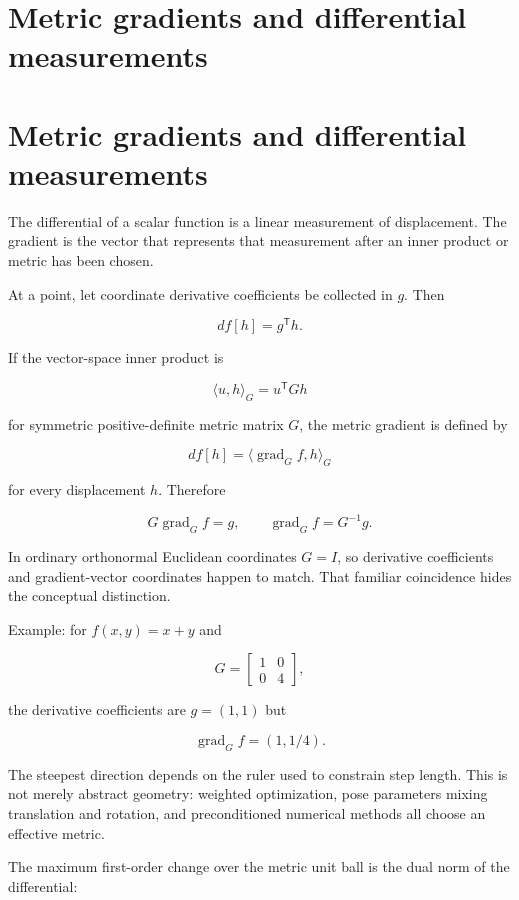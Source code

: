 \hypertarget{appendix-f4acdb1d5563}{}
\section*{Metric gradients and differential measurements}
\section{Metric gradients and differential measurements}\label{metric-gradients-and-differential-measurements}

The differential of a scalar function is a linear measurement of displacement. The gradient is the vector that represents that measurement after an inner product or metric has been chosen.

At a point, let coordinate derivative coefficients be collected in \(g\). Then

\[
df[h]=g^{\mathsf T}h.
\]

If the vector-space inner product is

\[
\langle u,h\rangle_G=u^{\mathsf T}Gh
\]

for symmetric positive-definite metric matrix \(G\), the metric gradient is defined by

\[
df[h]=\langle \operatorname{grad}_G f,h\rangle_G
\]

for every displacement \(h\). Therefore

\[
G\operatorname{grad}_G f=g,
\qquad
\operatorname{grad}_G f=G^{-1}g.
\]

In ordinary orthonormal Euclidean coordinates \(G=I\), so derivative coefficients and gradient-vector coordinates happen to match. That familiar coincidence hides the conceptual distinction.

Example: for \(f(x,y)=x+y\) and

\[
G=\begin{bmatrix}1&0\\0&4\end{bmatrix},
\]

the derivative coefficients are \(g=(1,1)\) but

\[
\operatorname{grad}_G f=(1,1/4).
\]

The steepest direction depends on the ruler used to constrain step length. This is not merely abstract geometry: weighted optimization, pose parameters mixing translation and rotation, and preconditioned numerical methods all choose an effective metric.

The maximum first-order change over the metric unit ball is the dual norm of the differential:

